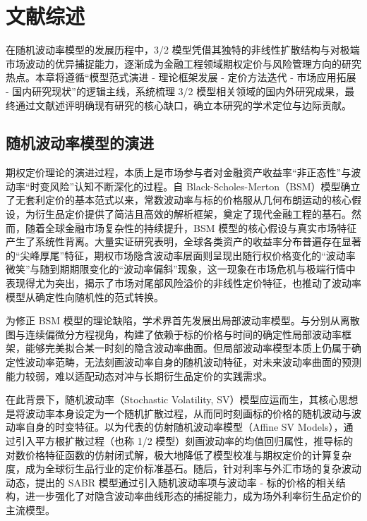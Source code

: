 \chapter{文献综述}

在随机波动率模型的发展历程中，3/2 模型凭借其独特的非线性扩散结构与对极端市场波动的优异捕捉能力，逐渐成为金融工程领域期权定价与风险管理方向的研究热点。本章将遵循“模型范式演进 - 理论框架发展 - 定价方法迭代 - 市场应用拓展 - 国内研究现状”的逻辑主线，系统梳理 3/2 模型相关领域的国内外研究成果，最终通过文献述评明确现有研究的核心缺口，确立本研究的学术定位与边际贡献。

\section{随机波动率模型的演进}

期权定价理论的演进过程，本质上是市场参与者对金融资产收益率“非正态性”与波动率“时变风险”认知不断深化的过程。自 Black-Scholes-Merton（BSM）模型\citet{blackPricingOptionsCorporate1973,mertonTheoryRationalOption1973}确立了无套利定价的基本范式以来，常数波动率与标的价格服从几何布朗运动的核心假设，为衍生品定价提供了简洁且高效的解析框架，奠定了现代金融工程的基石。然而，随着全球金融市场复杂性的持续提升，BSM 模型的核心假设与真实市场特征产生了系统性背离。大量实证研究表明，全球各类资产的收益率分布普遍存在显著的“尖峰厚尾”特征，期权市场隐含波动率层面则呈现出随行权价格变化的“波动率微笑”与随到期期限变化的“波动率偏斜”现象\citet{rubinsteinNonparametricTestsAlternative1985}，这一现象在市场危机与极端行情中表现得尤为突出，揭示了市场对尾部风险溢价的非线性定价特征，也推动了波动率模型从确定性向随机性的范式转换。

为修正 BSM 模型的理论缺陷，学术界首先发展出局部波动率模型。\citet{dermanRidingSmile1994}与\citet{Dupire1994}分别从离散图与连续偏微分方程视角，构建了依赖于标的价格与时间的确定性局部波动率框架，能够完美拟合某一时刻的隐含波动率曲面。但局部波动率模型本质上仍属于确定性波动率范畴，无法刻画波动率自身的随机波动特征，对未来波动率曲面的预测能力较弱，难以适配动态对冲与长期衍生品定价的实践需求。

在此背景下，随机波动率（Stochastic Volatility, SV）模型应运而生，其核心思想是将波动率本身设定为一个随机扩散过程，从而同时刻画标的价格的随机波动与波动率自身的时变特征。以\citet{hestonSimpleNewFormula1997}为代表的仿射随机波动率模型（Affine SV Models），通过引入平方根扩散过程（也称 1/2 模型）刻画波动率的均值回归属性，推导标的对数价格特征函数的仿射闭式解，极大地降低了模型校准与期权定价的计算复杂度，成为全球衍生品行业的定价标准基石。随后，针对利率与外汇市场的复杂波动动态，\citet{Hagan2002}提出的 SABR 模型通过引入随机波动率项与波动率 - 标的价格的相关结构，进一步强化了对隐含波动率曲线形态的捕捉能力，成为场外利率衍生品定价的主流模型。

